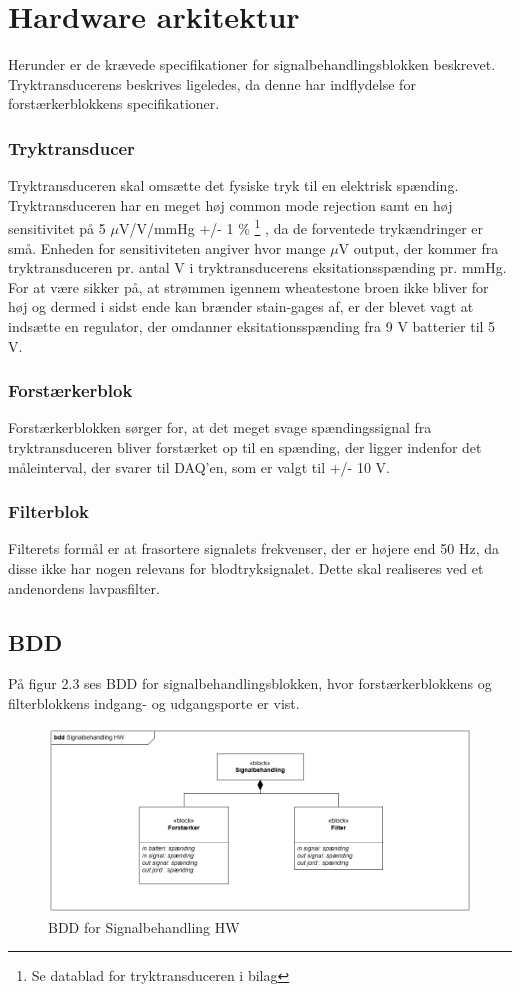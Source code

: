 \section{Hardware arkitektur}
Herunder er de krævede specifikationer for signalbehandlingsblokken beskrevet. Tryktransducerens beskrives ligeledes, da denne har indflydelse for forstærkerblokkens specifikationer. 

\subsubsection{Tryktransducer}
Tryktransduceren skal omsætte det fysiske tryk til en elektrisk spænding. Tryktransduceren har en meget høj common mode rejection samt en høj sensitivitet på 5 $\mu$V/V/mmHg +/- 1 \% \footnote{Se datablad for tryktransduceren i bilag} , da de forventede trykændringer er små. Enheden for sensitiviteten angiver hvor mange $\mu$V output, der kommer fra tryktransduceren pr. antal V i tryktransducerens eksitationsspænding pr. mmHg. For at være sikker på, at strømmen igennem wheatestone broen ikke bliver for høj og dermed i sidst ende kan brænder stain-gages af, er der blevet vagt at indsætte en regulator, der omdanner eksitationsspænding fra 9 V batterier til 5 V. 

\subsubsection{Forstærkerblok}
Forstærkerblokken sørger for, at det meget svage spændingssignal fra tryktransduceren bliver forstærket op til en spænding, der ligger indenfor det måleinterval, der svarer til DAQ'en, som er valgt til +/- 10 V.
 
\subsubsection{Filterblok}
Filterets formål er at frasortere signalets frekvenser, der er højere end 50 Hz, da disse ikke har nogen relevans for blodtryksignalet. Dette skal realiseres ved et andenordens lavpasfilter. 
 
\subsection{BDD}
På figur 2.3 ses BDD for signalbehandlingsblokken, hvor forstærkerblokkens og filterblokkens indgang- og udgangsporte er vist.  
\begin{figure}[H]
	\centering
	\includegraphics[width=1\textwidth]{Figurer/4}
	\caption{BDD for Signalbehandling HW}
	\label{fig:BDDhw-diagram}
\end{figure}

